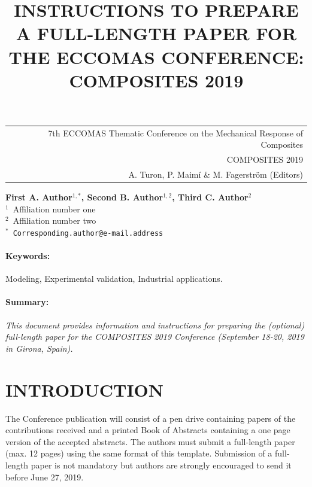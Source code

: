 \documentclass[12pt,a4paper]{article}
\begin{document}
\thispagestyle{empty}

\vspace*{-3.4cm}
\begin{table}[!h]
\begin{tabular}{r}
\hspace*{5.5cm} \scriptsize \textsf{7th ECCOMAS Thematic Conference on the Mechanical Response of Composites} \\
\hspace*{5.5cm} \scriptsize \textsf{ COMPOSITES 2019} \\
\hspace*{5.5cm} \tiny \textsf{A. Turon, P. Maimí \& M. Fagerström (Editors)}
\end{tabular}
\end{table}

\begin{center}
\title{INSTRUCTIONS TO PREPARE A FULL-LENGTH PAPER FOR THE ECCOMAS CONFERENCE: COMPOSITES 2019}
\end{center}
\begin{center}
\textbf{First A. Author$^{1,*}$, Second B. Author$^{1,2}$, Third C. Author$^{2}$} \\ [7pt]
\small{$^1$~Affiliation number one}  \\  [2pt]
\small{$^2$~Affiliation number two}  \\  [2pt]
\small{$^*$~\texttt{Corresponding.author@e-mail.address}} \\
\end{center}


\paragraph{Keywords:} Modeling, Experimental validation, Industrial applications.

\paragraph{Summary:} \textit{This document provides information and instructions for preparing the (optional) full-length paper for the COMPOSITES 2019 Conference (September 18-20, 2019 in Girona, Spain).}

\section{INTRODUCTION}

The Conference publication will consist of a pen drive containing papers of the contributions received and a printed Book of Abstracts containing a one page version of the accepted abstracts. The authors must submit a full-length paper (max. 12 pages) using the same format of this template. Submission of a full-length paper is not mandatory but authors are strongly encouraged to send it before June 27, 2019.
\end{document}
